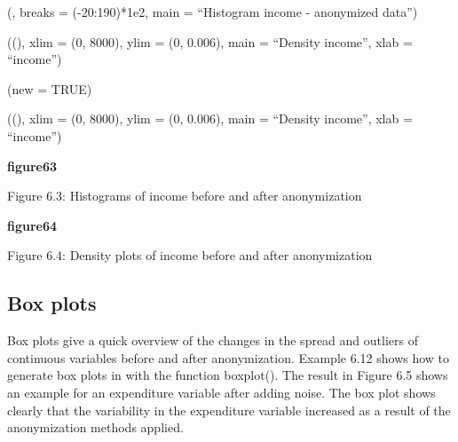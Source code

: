 \documentclass[letterpaper,10pt,english]{sphinxmanual}
\begin{document}
\begin{DUlineblock}{0em}
\item[] 
\item[] (, breaks = (-20:190)*1e2, main =
“Histogram income - anonymized data”)
\end{DUlineblock}

\begin{DUlineblock}{0em}
\item[] 
\item[] 
\item[] ((), xlim = (0,
8000), ylim = (0, 0.006), main = “Density income”, xlab =
“income”)
\item[] (new = TRUE)
\item[] 
\item[] ((), xlim =
(0, 8000), ylim = (0, 0.006), main = “Density income”,
xlab = “income”)
\end{DUlineblock}

{\color{red}\bfseries{}\textbar{}figure63\textbar{}}

Figure 6.3: Histograms of income before and after anonymization

{\color{red}\bfseries{}\textbar{}figure64\textbar{}}

Figure 6.4: Density plots of income before and after anonymization


\subsection{Box plots}
\label{\detokenize{utility:box-plots}}
Box plots give a quick overview of the changes in the spread and
outliers of continuous variables before and after anonymization. Example
6.12 shows how to generate box plots in  with the function boxplot().
The result in Figure 6.5 shows an example for an expenditure variable
after adding noise. The box plot shows clearly that the variability in
the expenditure variable increased as a result of the anonymization
methods applied.
\end{document}
